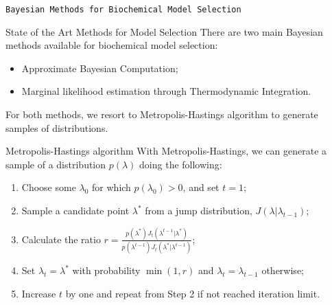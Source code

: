 \documentclass{beamer}
\begin{document}
\begin{frame}{}
\begin{center}
\texttt{Bayesian Methods for Biochemical Model Selection}
\end{center}
\end{frame}

\begin{frame}{State of the Art Methods for Model Selection}
There are two main Bayesian methods available for biochemical model 
selection:
\begin{itemize}
\pause
\item{Approximate Bayesian Computation;}

\pause
\item{Marginal likelihood estimation through Thermodynamic Integration.}
\end{itemize}

\pause
For both methods, we resort to Metropolis-Hastings algorithm to generate
samples of distributions.
\end{frame}


\begin{frame}{Metropolis-Hastings algorithm}
With Metropolis-Hastings, we can generate a sample of a distribution 
$p(\lambda)$ doing the following:
\pause
    \begin{enumerate}
        \pause
        \item{Choose some $\lambda_0$ for which $p (\lambda_0) > 0$, and
            set $t = 1$;}

        \pause
        \item{Sample a candidate point $\lambda^*$ from a jump 
            distribution, $J (\lambda | \lambda_{t-1})$;}

        \pause
        \item{Calculate the ratio 
            $r = \frac{p (\lambda^*) J_t (\lambda^{t - 1} | \lambda^*)}
            {p (\lambda^{t - 1}) J_t (\lambda^* | \lambda^{t - 1})}$;}

        \pause
        \item{Set $\lambda_t = \lambda^*$ with probability $\min (1, r)$
            and $\lambda_t = \lambda_{t-1}$ otherwise;}

        \pause
        \item{Increase $t$ by one and repeat from Step 2 if not reached
            iteration limit.}
    \end{enumerate}
\end{frame}

\end{document}
